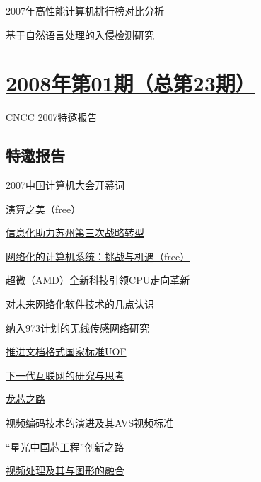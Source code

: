 \documentclass[a4paper]{article}
\begin{document}
\href{http://history.ccf.org.cn/resources/1190201776262/2010/04/15/024058.pdf}{2007年高性能计算机排行榜对比分析}

\href{http://history.ccf.org.cn/resources/1190201776262/2010/04/15/024065.pdf}{基于自然语言处理的入侵检测研究}


\section{\href{http://history.ccf.org.cn/sites/ccf/jsjtbbd.jsp?contentId=2542567628986}{\textbf{2008年第01期（总第23期）}}}
CNCC 2007特邀报告
\subsection{特邀报告}
\href{http://history.ccf.org.cn/resources/1190201776262/2010/04/15/023012.pdf}{2007中国计算机大会开幕词}

\href{http://history.ccf.org.cn/resources/1190201776262/2010/04/15/023013.pdf}{演算之美（free）}

\href{http://history.ccf.org.cn/resources/1190201776262/2010/04/15/023018.pdf}{信息化助力苏州第三次战略转型}

\href{http://history.ccf.org.cn/resources/1190201776262/2010/04/15/023020.pdf}{网络化的计算机系统：挑战与机遇（free）}

\href{http://history.ccf.org.cn/resources/1190201776262/2010/04/15/023024.pdf}{超微（AMD）全新科技引领CPU走向革新}

\href{http://history.ccf.org.cn/resources/1190201776262/2010/04/15/023029.pdf}{对未来网络化软件技术的几点认识}

\href{http://history.ccf.org.cn/resources/1190201776262/2010/04/15/023036.pdf}{纳入973计划的无线传感网络研究}

\href{http://history.ccf.org.cn/resources/1190201776262/2010/04/15/023043.pdf}{推进文档格式国家标准UOF}

\href{http://history.ccf.org.cn/resources/1190201776262/2010/04/15/023048.pdf}{下一代互联网的研究与思考}

\href{http://history.ccf.org.cn/resources/1190201776262/2010/04/15/023052.pdf}{龙芯之路}

\href{http://history.ccf.org.cn/resources/1190201776262/2010/04/15/023059.pdf}{视频编码技术的演进及其AVS视频标准}

\href{http://history.ccf.org.cn/resources/1190201776262/2010/04/15/023065.pdf}{“星光中国芯工程”创新之路}

\href{http://history.ccf.org.cn/resources/1190201776262/2010/04/15/023068.pdf}{视频处理及其与图形的融合}
\end{document}
